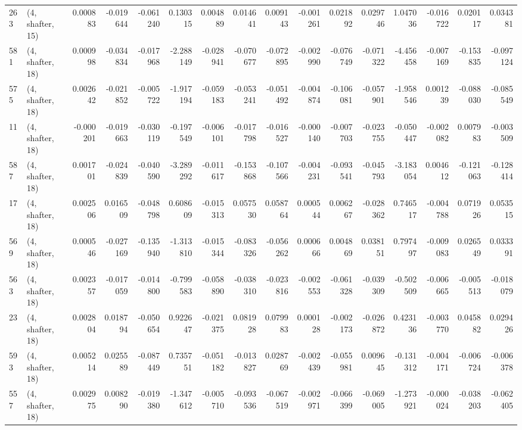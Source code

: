 \begin{tabular}{llrrrrrrrrrrrrrr}
263 &  (4, shafter, 15) &   0.000883 & -0.019644 & -0.061240 &    0.130315 &  0.004889 &   0.014641 &   0.009143 & -0.001261 &  0.021892 &  0.029746 &    1.047036 & -0.016722 &   0.020117 &   0.034381 \\
581 &  (4, shafter, 18) &   0.000998 & -0.034834 & -0.017968 &   -2.288149 & -0.028941 &  -0.070677 &  -0.072895 & -0.002990 & -0.076749 & -0.071322 &   -4.456458 & -0.007169 &  -0.153835 &  -0.097124 \\
575 &  (4, shafter, 18) &   0.002642 & -0.021852 & -0.005722 &   -1.917194 & -0.059183 &  -0.053241 &  -0.051492 & -0.004874 & -0.106081 & -0.057901 &   -1.958546 &  0.001239 &  -0.088030 &  -0.085549 \\
11  &  (4, shafter, 18) &  -0.000201 & -0.019663 & -0.030119 &   -0.197549 & -0.006101 &  -0.017798 &  -0.016527 & -0.000140 & -0.007703 & -0.023755 &   -0.050447 & -0.002082 &   0.007983 &  -0.003509 \\
587 &  (4, shafter, 18) &   0.001701 & -0.024839 & -0.040590 &   -3.289292 & -0.011617 &  -0.153868 &  -0.107566 & -0.004231 & -0.093541 & -0.045793 &   -3.183054 &  0.004612 &  -0.121063 &  -0.128414 \\
17  &  (4, shafter, 18) &   0.002506 &  0.016509 & -0.048798 &    0.608609 & -0.015313 &   0.057530 &   0.058764 &  0.000544 &  0.006267 & -0.028362 &    0.746517 & -0.004788 &   0.071926 &   0.053515 \\
569 &  (4, shafter, 18) &   0.000546 & -0.027169 & -0.135940 &   -1.313810 & -0.015344 &  -0.083326 &  -0.056262 &  0.000666 &  0.004869 &  0.038151 &    0.797497 & -0.009083 &   0.026549 &   0.033391 \\
563 &  (4, shafter, 18) &   0.002357 & -0.017059 & -0.014800 &   -0.799583 & -0.058890 &  -0.038310 &  -0.023816 & -0.002553 & -0.061328 & -0.039309 &   -0.502509 & -0.006665 &  -0.005513 &  -0.018079 \\
23  &  (4, shafter, 18) &   0.002804 &  0.018794 & -0.050654 &    0.922647 & -0.021375 &   0.081928 &   0.079983 &  0.000128 & -0.002173 & -0.026872 &    0.423136 & -0.003770 &   0.045882 &   0.029426 \\
593 &  (4, shafter, 18) &   0.005214 &  0.025589 & -0.087449 &    0.735751 & -0.051182 &  -0.013827 &   0.028769 & -0.002439 & -0.055981 &  0.009645 &   -0.131312 & -0.004171 &  -0.006724 &  -0.006378 \\
557 &  (4, shafter, 18) &   0.002975 &  0.008290 & -0.019380 &   -1.347612 & -0.005710 &  -0.093536 &  -0.067519 & -0.002971 & -0.066399 & -0.069005 &   -1.273921 & -0.000024 &  -0.038203 &  -0.062405 \\

\end{tabular}
